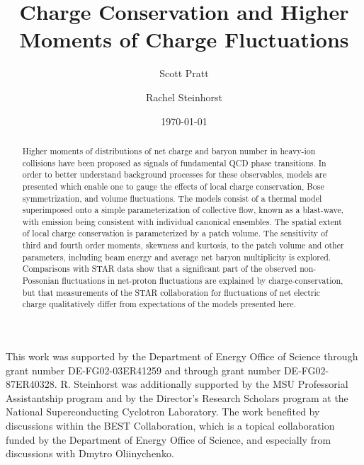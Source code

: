 \documentclass[aps,prc,nofootinbib,showpacs,superscriptaddress,groupedaddress]{revtex4-1}
\begin{document}
\title{Charge Conservation and Higher Moments of Charge Fluctuations}
\author{Scott Pratt}
\author{Rachel Steinhorst}
\date{\today}

\pacs{}

\begin{abstract}
Higher moments of distributions of net charge and baryon number in heavy-ion collisions have been proposed as signals of fundamental QCD phase transitions. In order to better understand background processes for these observables, models are presented which enable one to gauge the effects of local charge conservation, Bose symmetrization, and volume fluctuations. The models consist of a thermal model superimposed onto a simple parameterization of collective flow, known as a blast-wave, with emission being consistent with individual canonical ensembles. The spatial extent of local charge conservation is parameterized by a patch volume. The sensitivity of third and fourth order moments, skewness and kurtosis, to the patch volume and other parameters, including beam energy and average net baryon multiplicity is explored. Comparisons with STAR data show that a significant part of the observed non-Possonian fluctuations in net-proton fluctuations are explained by charge-conservation, but that measurements of the STAR collaboration for fluctuations of net electric charge qualitatively differ from expectations of the models presented here.
\end{abstract}

\maketitle

















\begin{acknowledgments}
This work was supported by the Department of Energy Office of Science through grant number DE-FG02-03ER41259 and through grant number DE-FG02-87ER40328. R. Steinhorst was additionally supported by the MSU Professorial Assistantship program and by the Director's Research Scholars program at the National Superconducting Cyclotron Laboratory. The work benefited by discussions within the BEST Collaboration, which is a topical collaboration funded by the Department of Energy Office of Science, and especially from discussions with Dmytro Oliinychenko.
\end{acknowledgments}


\end{document}
